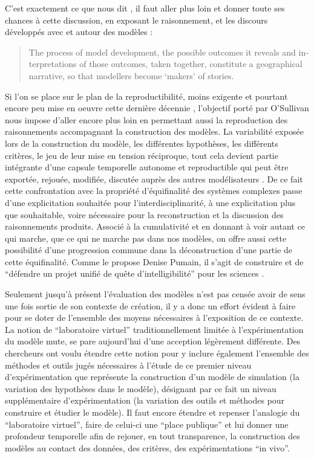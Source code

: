 C'est exactement ce que nous dit \textcites{OSullivan2004,Millington2012}, il faut aller plus loin et donner toute ses chances à cette discussion, en exposant le raisonnement, et les discours développés avec et autour des modèles :

\foreignblockquote{english}[\cite{OSullivan2004}]{The process of model development, the possible outcomes it reveals and interpretations of those outcomes, taken together, constitute a geographical narrative, so that modellers become ‘makers’ of stories.}

Si l'on se place sur le plan de la reproductibilité, moins exigente et pourtant encore peu mise en oeuvre cette dernière décennie \autocite{Wilensky2007a}, l'objectif porté par O'Sullivan nous impose d'aller encore plus loin en permettant aussi la reproduction des raisonnements accompagnant la construction des modèles. La variabilité exposée lors de la construction du modèle, les différentes hypothèses, les différents critères, le jeu de leur mise en tension réciproque, tout cela devient partie intégrante d'une capsule temporelle autonome et reproductible qui peut être exportée, rejouée, modifiée, discutée auprès des autres modélisateurs . De ce fait cette confrontation avec la propriété d'équifinalité des systèmes complexes passe d'une explicitation souhaitée pour l'interdisciplinarité, à une explicitation plus que souhaitable, voire nécessaire pour la reconstruction et la discussion des raisonnements produits. Associé à la cumulativité et en donnant à voir autant ce qui marche, que ce qui ne marche pas dans nos modèles, on offre aussi cette possibilité d'une progression commune dans la déconstruction d'une partie de cette équifinalité. Comme le propose Denise Pumain, il s'agit de construire et de \enquote{défendre un projet unifié de quête d'intelligibilité} pour les sciences \autocite[157-158]{Mathieu2014}.

Seulement jusqu'à présent l'évaluation des modèles n'est pas censée avoir de sens une fois sortie de son contexte de création, il y a donc un effort évident à faire pour se doter de l'ensemble des moyens nécessaires à l'exposition de ce contexte. La notion de \enquote{laboratoire virtuel} traditionnellement limitée à l'expérimentation du modèle mute, se pare aujourd'hui d'une acception légèrement différente. Des chercheurs \autocites{Schmitt2014, Amblard2003} ont voulu étendre cette notion pour y inclure également l'ensemble des méthodes et outils jugés nécessaires à l'étude de ce premier niveau d'expérimentation que représente la construction d'un modèle de simulation (la variation des hypothèses dans le modèle), désignant par ce fait un niveau supplémentaire d’expérimentation (la variation des outils et méthodes pour construire et étudier le modèle). Il faut encore étendre et repenser l'analogie du \enquote{laboratoire virtuel}, faire de celui-ci une \enquote{place publique} et lui donner une profondeur temporelle afin de rejouer, en tout transparence, la construction des modèles au contact des données, des critères, des expérimentations \foreignquote{latin}{in vivo}.
